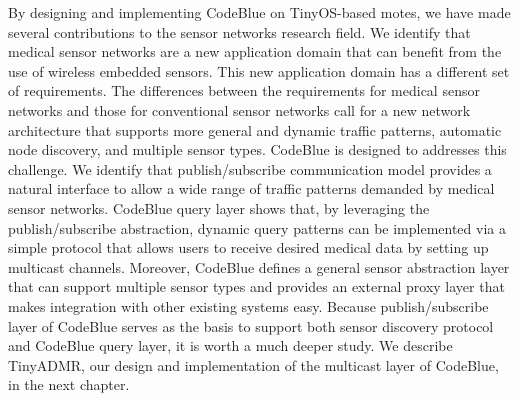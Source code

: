 By designing and implementing CodeBlue on TinyOS-based motes, we have made
several contributions to the sensor networks research field. We
identify that medical sensor networks are a new application domain that can
benefit from the use of wireless embedded sensors. This new application domain
has a different set of requirements. The differences between the requirements
for medical sensor networks and those for conventional sensor networks
call for a new network architecture that supports more general and dynamic
traffic patterns, automatic node discovery, and multiple sensor types. CodeBlue is designed to addresses this challenge. We
identify that publish/subscribe communication model provides a natural
interface to allow a wide range of traffic patterns demanded by medical sensor
networks. CodeBlue query layer shows that, by leveraging the
publish/subscribe abstraction, dynamic query patterns can be implemented via a
simple protocol that allows users to receive desired medical data by
setting up multicast channels. Moreover, CodeBlue defines a general sensor
abstraction layer that can support multiple sensor types and provides an
external proxy layer that makes integration with other existing systems easy.
Because publish/subscribe layer of CodeBlue serves as the basis to support
both sensor discovery protocol and CodeBlue query layer, it is worth a much
deeper study. We describe TinyADMR, our design and implementation of the
multicast layer of CodeBlue, in the next chapter.
